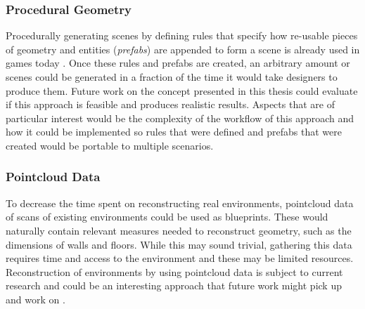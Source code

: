 \subsubsection{Procedural Geometry}
Procedurally generating scenes by defining rules that specify how re-usable pieces of geometry and entities (\emph{prefabs}) are appended to form a scene is already used in games today \cite{strafeWiki}. Once these rules and prefabs are created, an arbitrary amount or scenes could be generated in a fraction of the time it would take designers to produce them. Future work on the concept presented in this thesis could evaluate if this approach is feasible and produces realistic results. Aspects that are of particular interest would be the complexity of the workflow of this approach and how it could be implemented so rules that were defined and prefabs that were created would be portable to multiple scenarios.

\subsubsection{Pointcloud Data}
To decrease the time spent on reconstructing real environments, pointcloud data of scans of existing environments could be used as blueprints. These would naturally contain relevant measures needed to reconstruct geometry, such as the dimensions of walls and floors. While this may sound trivial, gathering this data requires time and access to the environment and these may be limited resources. Reconstruction of environments by using pointcloud data is subject to current research and could be an interesting approach that future work might pick up and work on \cite{MINEO201981}. 
